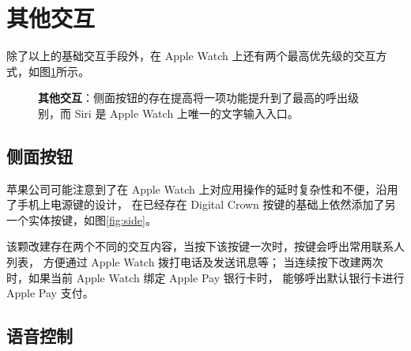 \section{其他交互}

除了以上的基础交互手段外，在 Apple Watch 上还有两个最高优先级的交互方式，如图\ref{fig:others}所示。

\begin{figure}[H]
    \kaishu
    \centering
    \caption{\textbf{其他交互}：侧面按钮的存在提高将一项功能提升到了最高的呼出级别，而 Siri 是 Apple Watch 上唯一的文字输入入口。}
    \label{fig:others}
\end{figure}

\subsection{侧面按钮}

苹果公司可能注意到了在 Apple Watch 上对应用操作的延时复杂性和不便，沿用了手机上电源键的设计，
在已经存在 Digital Crown 按键的基础上依然添加了另一个实体按键，如图\ref{fig:side}。

该颗改建存在两个不同的交互内容，当按下该按键一次时，按键会呼出常用联系人列表，
方便通过 Apple Watch 拨打电话及发送讯息等；
当连续按下改建两次时，如果当前 Apple Watch 绑定 Apple Pay 银行卡时，
能够呼出默认银行卡进行 Apple Pay 支付。

\subsection{语音控制}


